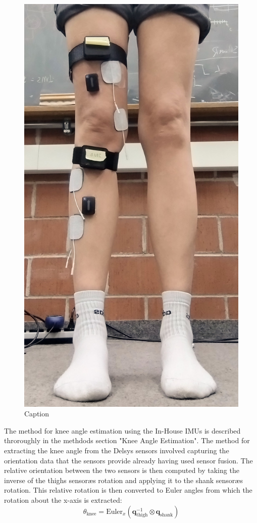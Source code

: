 \begin{figure} 
    \centering
    \includegraphics[width=\linewidth]{images/delsyssetup.jpg}
    \caption{Caption}
    \label{fig:enter-label}
\end{figure}

The method for knee angle estimation using the In-House IMUs is described throroughly in the methdods section "Knee Angle Estimation". The method for extracting the knee angle from the Delsys sensors involved capturing the orientation data that the sensors provide already having used sensor fusion. The relative orientation between the two sensors is then computed by taking the inverse of the thighs sensoræs rotation and applying it to the shank sensoræs rotation. This relative rotation is then converted to Euler angles from which the rotation about the x-axis is extracted:
\begin{equation}
    \theta_{\text{knee}} = \text{Euler}_x \left( \mathbf{q}_{\text{thigh}}^{-1} \otimes \mathbf{q}_{\text{shank}} \right)
\end{equation}

